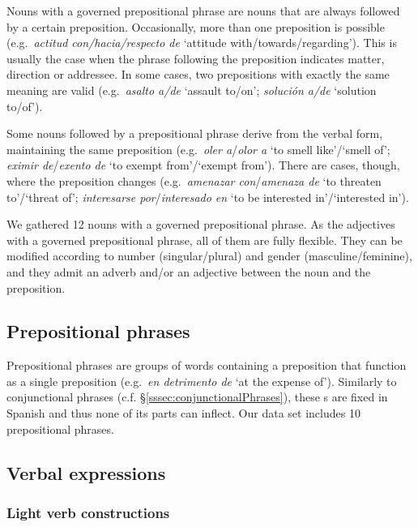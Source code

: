 \documentclass[output=paper]{langsci/langscibook}
\begin{document}
Nouns with a governed prepositional phrase are nouns that are always followed by a certain preposition.
Occasionally, more than one preposition is possible (e.g.\ \textit{actitud con/hacia/respecto de} `attitude with/towards/regarding').
This is usually the case when the phrase following the preposition indicates matter, direction or addressee.
In some cases, two prepositions with exactly the same meaning are valid (e.g.\ \textit{asalto a/de} `assault to/on'; \textit{solución a/de} `solution to/of').

Some nouns followed by a prepositional phrase derive from the verbal form, maintaining the same preposition (e.g.\ \textit{oler a}/\textit{olor a} `to smell like'/`smell of'; \textit{eximir de}/\textit{exento de} `to exempt from'/`exempt from').
There are cases, though, where the preposition changes 
(e.g.\ \textit{amenazar con}/\textit{amenaza de} `to threaten to'/`threat of'; 
\textit{interesarse por}/\textit{interesado en} `to be interested in'/`interested in').

We gathered 12 nouns with a governed prepositional phrase.
As the adjectives with a governed prepositional phrase, all of them are fully flexible.
They can be modified according to number (singular/plural) and gender (masculine/feminine), and they admit an adverb and/or an adjective between the noun and the preposition.

\subsection{Prepositional phrases}
\label{sssec:prepositionalPhrases}
Prepositional phrases are groups of words containing a preposition that function as a single preposition (e.g.\ \textit{en detrimento de} `at the expense of'). 
Similarly to conjunctional phrases (c.f. §\ref{sssec:conjunctionalPhrases}), these \mwe s are fixed in Spanish and thus none of its parts can inflect.
Our data set includes 10 prepositional phrases.

\subsection{Verbal expressions}
\label{sssec:verbalExpressions}

\subsubsection{Light verb constructions}
\label{ssssec:lightVerbs}
\end{document}

